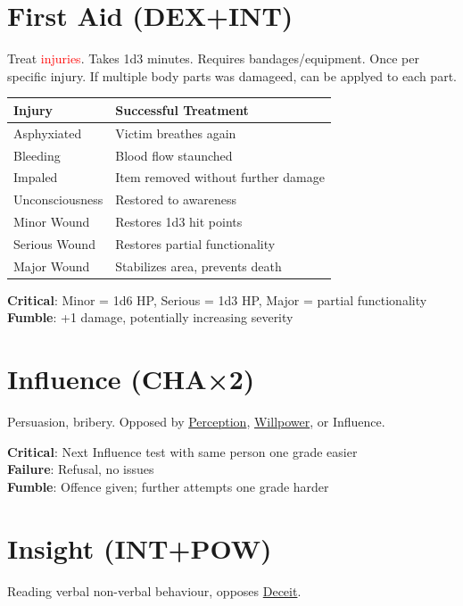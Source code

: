 \documentclass[10pt]{article}
\begin{document}
\section{First Aid (DEX+INT)}
\label{skill:firstaid}

Treat \textcolor{red}{injuries}. Takes 1d3 minutes. Requires bandages/equipment. Once per specific injury. If multiple body parts was damageed, can be applyed to each part.

\begin{longtable}{|l|l|}
\hline
\textbf{Injury} & \textbf{Successful Treatment} \\
\hline
Asphyxiated & Victim breathes again \\
Bleeding & Blood flow staunched \\
Impaled & Item removed without further damage \\
Unconsciousness & Restored to awareness \\
Minor Wound & Restores 1d3 hit points \\
Serious Wound & Restores partial functionality \\
Major Wound & Stabilizes area, prevents death \\
\hline
\end{longtable}

\textbf{Critical}: Minor = 1d6 HP, Serious = 1d3 HP, Major = partial functionality\\
\textbf{Fumble}: +1 damage, potentially increasing severity

\section{Influence (CHA×2)}
\label{skill:influence}

Persuasion, bribery. Opposed by \hyperref[skill:perception]{Perception}, \hyperref[skill:willpower]{Willpower}, or Influence.

\textbf{Critical}: Next Influence test with same person one grade easier\\
\textbf{Failure}: Refusal, no issues\\
\textbf{Fumble}: Offence given; further attempts one grade harder

\section{Insight (INT+POW)}
\label{skill:insight}

Reading verbal non-verbal behaviour, opposes \hyperref[skill:deceit]{Deceit}.
\end{document}

